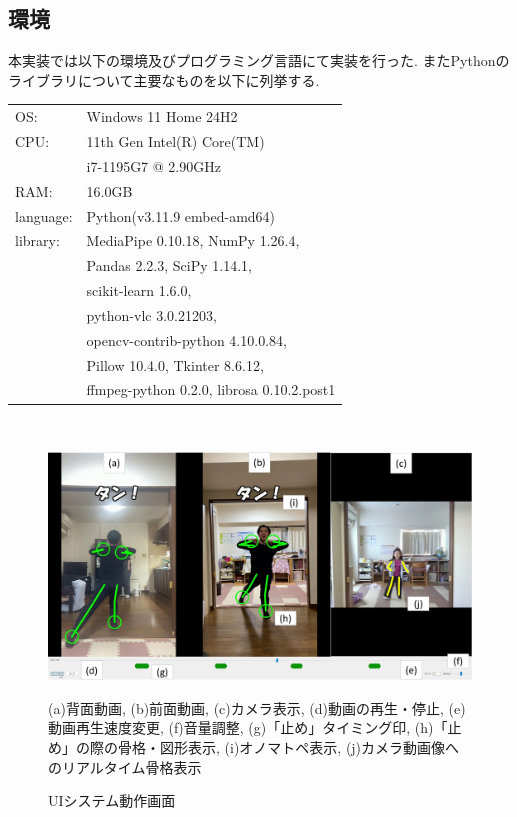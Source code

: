 \documentclass[paper]{ieicej}
\begin{document}
\subsection{環境}
本実装では以下の環境及びプログラミング言語にて実装を行った. またPythonのライブラリについて主要なものを以下に列挙する. 
\begin{tabular}{l l}
  OS:       & Windows 11 Home 24H2\\
  CPU:      & 11th Gen Intel(R) Core(TM)\\
            & i7-1195G7 @ 2.90GHz\\
  RAM:      & 16.0GB\\
  language: & Python(v3.11.9 embed-amd64)\\
  library:  & MediaPipe 0.10.18, NumPy 1.26.4,\\
            & Pandas 2.2.3, SciPy 1.14.1,\\
            & scikit-learn 1.6.0,\\
            & python-vlc 3.0.21203,\\
            & opencv-contrib-python 4.10.0.84,\\
            & Pillow 10.4.0, Tkinter 8.6.12,\\
            & ffmpeg-python 0.2.0, librosa 0.10.2.post1
\end{tabular}
\\
\begin{figure}[t]
  \centering
  \includegraphics[width=\linewidth]{./images/UI_system_ui2.png}
  \caption{UIシステム動作画面}
  \label{fig:ui_system}
  \begin{flushleft}
    \footnotesize (a)背面動画, (b)前面動画, (c)カメラ表示, (d)動画の再生・停止, (e)動画再生速度変更, (f)音量調整, (g)「止め」タイミング印, (h)「止め」の際の骨格・図形表示, (i)オノマトペ表示, (j)カメラ動画像へのリアルタイム骨格表示
  \end{flushleft}
\end{figure}
\end{document}
